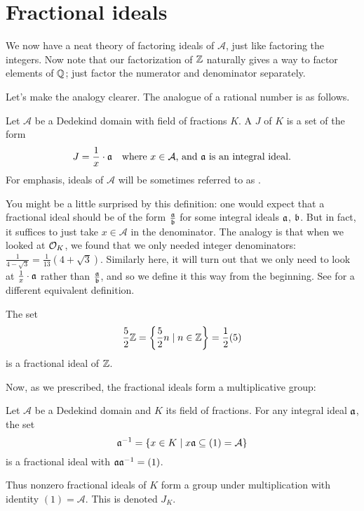 \section{Fractional ideals}
We now have a neat theory of factoring ideals of $\mathcal A$,
just like factoring the integers.
Now note that our factorization of $\ZZ$ naturally gives a way to factor
elements of $\QQ$; just factor the numerator and denominator separately.

Let's make the analogy clearer.
The analogue of a rational number is as follows.

\begin{definition}
	Let $\mathcal A$ be a Dedekind domain with field of fractions $K$.
	A  $J$ of $K$ is a set of the form 
	\[ J = \frac{1}{x} \cdot \aa \quad \text{where $x \in \mathcal A$, and $\aa$ is an integral ideal.} \]
	For emphasis, ideals of $\mathcal A$ will be sometimes referred to as .
\end{definition}

You might be a little surprised by this definition:
one would expect that a fractional ideal should be of the form $\frac{\aa}{\bb}$
for some integral ideals $\aa$, $\bb$.
But in fact, it suffices to just take $x \in \mathcal A$ in the denominator.
The analogy is that when we looked at $\OO_K$, we found that we only needed
integer denominators: $\frac{1}{4-\sqrt3} = \frac{1}{13}(4+\sqrt3)$.
Similarly here, it will turn out that we only need to look at $\frac1x \cdot \aa$
rather than $\frac{\aa}{\bb}$, and so we define it this way from the beginning.
See  for a different equivalent definition.

\begin{example}
	The set \[ \frac52 \ZZ = \left\{ \frac52n \mid n \in \ZZ \right\} = \half (5) \]
	is a fractional ideal of $\ZZ$.
\end{example}

Now, as we prescribed, the fractional ideals form a multiplicative group:
\begin{theorem}
	Let $\mathcal A$ be a Dedekind domain and $K$ its field of fractions.
	For any integral ideal $\aa$, the set
	\[ \aa\inv = \left\{ x \in K
			\mid x\aa \subseteq (1) = \mathcal A \right\} \]
	is a fractional ideal with $\aa \aa\inv = (1)$.
\end{theorem}
\begin{definition}
	Thus nonzero fractional ideals of $K$ form a group under multiplication
	with identity $(1) = \mathcal A$.
	This  is denoted $J_K$.
\end{definition}

